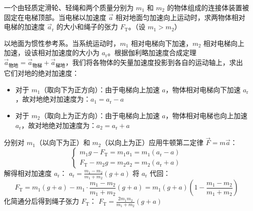 \documentclass[lang=cn,11pt]{elegantbook}
\begin{document}
\begin{example}
一个由轻质定滑轮、轻绳和两个质量分别为 $m_1$ 和 $m_2$ 的物体组成的连接体装置被固定在电梯顶部。当电梯以加速度 $\vec{a}$ 相对地面匀加速向上运动时，求两物体相对电梯的加速度 $\vec{a}_{\text{r}}$ 的大小和绳子的张力 $F_{\text{T}}$。（设 $m_1 > m_2$）
\end{example}
\begin{solution}
以地面为惯性参考系。当系统运动时，$m_1$ 相对电梯向下加速，$m_2$ 相对电梯向上加速，设该相对加速度的大小为 $a_{\text{r}}$。根据伽利略加速度合成定理 $\vec{a}_{\text{物地}} = \vec{a}_{\text{物梯}} + \vec{a}_{\text{梯地}}$，我们将各物体的矢量加速度投影到各自的运动轴上，求出它们对地的绝对加速度：
\begin{itemize}
\item 对于 $m_1$（取向下为正方向）：由于电梯向上加速 $a$，物体相对电梯向下加速 $a_{\text{r}}$，故对地绝对加速度为：$a_1 = a_{\text{r}} - a$
\item 对于 $m_2$（取向上为正方向）：由于电梯向上加速 $a$，物体相对电梯也向上加速 $a_{\text{r}}$，故对地绝对加速度为：$a_2 = a_{\text{r}} + a$
\end{itemize}
分别对 $m_1$（以向下为正）和 $m_2$（以向上为正）应用牛顿第二定律 $\vec{F} = m\vec{a}$：$$\begin{cases}
m_1g - F_{\text{T}} = m_1a_1 = m_1(a_{\text{r}} - a) \\
F_{\text{T}} - m_2g = m_2a_2 = m_2(a_{\text{r}} + a)
\end{cases}$$
解得相对加速度 $a_{\text{r}}$： \(a_{\text{r}} = \frac{m_1 - m_2}{m_1 + m_2}(g + a)\) 将 $a_{\text{r}}$ 代回：$$F_{\text{T}} = m_1(g + a) - m_1 \cdot \frac{m_1 - m_2}{m_1 + m_2}(g + a) = m_1(g + a) \left( 1 - \frac{m_1 - m_2}{m_1 + m_2} \right)$$化简通分后得到绳子张力 $F_{\text{T}}$： \(F_{\text{T}} = \frac{2m_1m_2}{m_1 + m_2}(g + a)\) 
\end{solution}
\end{document}
